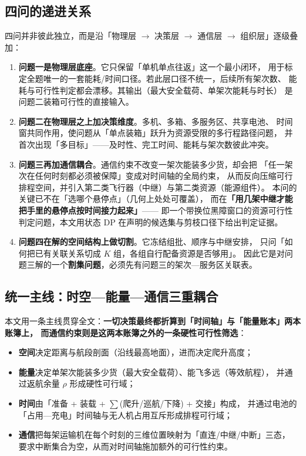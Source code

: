 \documentclass[12pt,a4paper,fontset=windows]{ctexart}
\begin{document}
\subsection{四问的递进关系}
四问并非彼此独立，而是沿「物理层 $\to$ 决策层 $\to$ 通信层 $\to$ 组织层」逐级叠加：
\begin{enumerate}[leftmargin=2.2em,itemsep=2pt]
\item \textbf{问题一是物理层底座}。它只保留「单机单点往返」这一个最小闭环，
   用于标定全题唯一的一套能耗/时间口径。若此层口径不统一，后续所有架次数、
   能耗与可行性判定都会漂移。其输出（最大安全载荷、单架次能耗与时长）
   是问题二装箱可行性的直接输入。
\item \textbf{问题二在物理层之上加决策维度}。多机、多箱、多服务区、共享电池、
   时间窗共同作用，使问题从「单点装箱」跃升为资源受限的多行程路径问题，
   并首次出现「多目标」——及时性、完工时间、能耗与架次数彼此冲突。
\item \textbf{问题三再加通信耦合}。通信约束不改变一架次能装多少货，却会把
   「任一架次在任何时刻都必须被保障」变成对时间轴的全局约束，
   从而反向压缩可行排程空间，并引入第二类飞行器（中继）与第二类资源（能源组件）。
   本问的关键已不在「选哪个悬停点」（几何上处处可覆盖），
   而在\textbf{「用几架中继才能把手里的悬停点按时间接力起来」}——
   即一个带换位黑障窗口的资源可行性判定问题，本文用状态 DP 在声明的候选集与剪枝口径下给出判定证据。
\item \textbf{问题四在解的空间结构上做切割}。它冻结组批、顺序与中继安排，
   只问「如何把已有关联关系切成 $K$ 组，各组自行配备资源是否够用」。
   因此它是对问题三解的一个\textbf{割集问题}，必须先有问题三的架次—服务区关联表。
\end{enumerate}

\subsection{统一主线：时空—能量—通信三重耦合}
本文用一条主线贯穿全文：\textbf{一切决策最终都折算到「时间轴」与「能量账本」两本账簿上，
而通信约束则是这两本账簿之外的一条硬性可行性筛选}：
\begin{itemize}[leftmargin=2.2em,itemsep=2pt]
\item \textbf{空间}决定距离与航段剖面（沿线最高地面），进而决定爬升高度；
\item \textbf{能量}决定单架次能装多少货（最大安全载荷）、能飞多远（等效航程），
      并通过返航余量 $\rho$ 形成硬性可行域；
\item \textbf{时间}由「准备 + 装载 + $\sum$(爬升/巡航/下降) + 交接」构成，
      并通过电池的「占用—充电」时间轴与无人机占用互斥形成排程可行域；
\item \textbf{通信}把每架运输机在每个时刻的三维位置映射为「直连/中继/中断」三态，
      要求中断集合为空，从而对时间轴施加额外的可行性约束。
\end{itemize}
\end{document}
